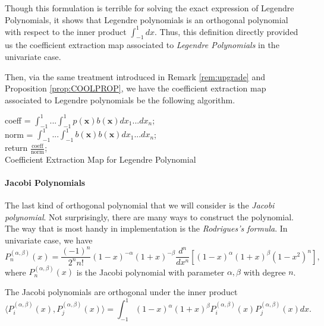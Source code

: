 \documentclass[12pt]{amsart}
\numberwithin{equation}{section}
\theoremstyle{definition}
\numberwithin{thm}{section}
\begin{document}
Though this formulation is terrible for solving the exact expression of {Legendre Polynomials},
it shows that {Legendre polynomials} is an orthogonal polynomial with respect to the inner product $\int_{-1}^{1} dx$. 
Thus, this definition directly provided us the {coefficient extraction map} associated to \emph{Legendre Polynomials} in the univariate case. 

Then, via the same treatment introduced in Remark \ref{rem:upgrade} and Proposition \ref{prop:COOLPROP},
we have the {coefficient extraction map} associated to {Legendre polynomials} be the following algorithm.

\begin{algorithm}[H]
     \SetAlgoLined
     coeff = $\int_{-1}^1 ... \int_{-1}^1  p(\mathbf{x})b(\mathbf{x}) dx_1 ... dx_n$;\\
     norm = $\int_{-1}^1 ... \int_{-1}^1 b(\mathbf{x}) b(\mathbf{x}) dx_1 ... dx_n$;\\
     return $\frac{\text{coeff}}{\text{norm}}$;\\
     \caption{Coefficient Extraction Map for Legendre Polynomial}
\end{algorithm}

\paragraph{Jacobi Polynomials}
The last kind of orthogonal polynomial that we will consider is the \emph{Jacobi polynomial}. 
Not surprisingly, there are many ways to construct the polynomial. 
The way that is most handy in implementation is the \emph{Rodrigues's formula}. In univariate case, we have
\begin{equation*}
     P^{(\alpha, \beta)}_n(x) = \frac{(-1)^n}{2^n n!} (1-x)^{-\alpha} (1+x)^{-\beta} \frac{d^n}{dx^n} [(1-x)^{\alpha}(1+x)^{\beta}(1-x^2)^n],
\end{equation*}
where $P^{(\alpha, \beta)}_n(x)$ is the Jacobi polynomial with parameter $\alpha, \beta$ with degree $n$. 

The Jacobi polynomials are orthogonal under the inner product
\begin{equation*}
    \langle P^{(\alpha, \beta)}_i(x), P^{(\alpha, \beta)}_j(x) \rangle = \int_{-1}^1 (1-x)^{\alpha} (1+x)^{\beta} P^{(\alpha, \beta)}_i(x) P^{(\alpha, \beta)}_j(x) dx.
\end{equation*}
\end{document}
